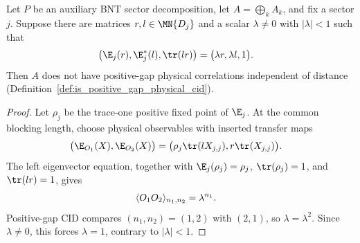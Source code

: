 \begin{lemma}%
    \label{thm:zcl_subleading_pair_excludes_cid}
    \leanok
    Let $P$ be an auxiliary BNT sector decomposition, let
    $A=\bigoplus_k A_k$, and fix a
    sector $j$. Suppose there are matrices $r,l\in\MN{D_j}$ and a scalar
    $\lambda\ne0$ with $|\lambda|<1$ such that
    \begin{align}
        \bigl(\E_j(r),\E_j^*(l),\tr(lr)\bigr)
         & =\bigl(\lambda r,\lambda l,1\bigr).
        \notag
    \end{align}
    Then $A$ does not have positive-gap physical correlations independent of
    distance (Definition~\ref{def:is_positive_gap_physical_cid}).
\end{lemma}
\begin{proof}\leanok
    Let $\rho_j$ be the trace-one positive fixed point of $\E_j$. At the
    common blocking length, choose physical observables with inserted transfer
    maps
    \begin{align}
        \bigl(\E_{O_1}(X),\E_{O_2}(X)\bigr)
         & =\bigl(\rho_j\tr(lX_{j,j}),r\tr(X_{j,j})\bigr).
        \notag
    \end{align}
    The left eigenvector equation, together with
    $\E_j(\rho_j)=\rho_j$, $\tr(\rho_j)=1$, and $\tr(lr)=1$, gives
    \begin{align}
        \langle O_1 O_2\rangle_{n_1,n_2} & =\lambda^{n_1}.
        \notag
    \end{align}
    Positive-gap CID compares $(n_1,n_2)=(1,2)$ with $(2,1)$, so
    $\lambda=\lambda^2$. Since $\lambda\ne0$, this forces $\lambda=1$,
    contrary to $|\lambda|<1$.
\end{proof}

